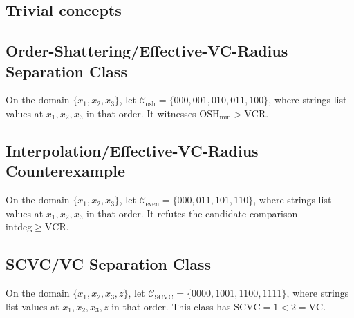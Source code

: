
  \subsection{Trivial concepts}\label{cl:trivial_concepts}
  \begin{definition}
  
  \end{definition}

  \subsection{Order-Shattering/Effective-VC-Radius Separation Class}\label{cl:order_shattering_effective_vc_radius_separation}
  \begin{definition}
  On the domain $\{x_1,x_2,x_3\}$, let
  $\mathcal C_{\mathrm{osh}}=\{000,001,010,011,100\}$, where strings list
  values at $x_1,x_2,x_3$ in that order.  It witnesses
  $\mathrm{OSH}_{\min}>\mathrm{VCR}$.
  \end{definition}

  \subsection{Interpolation/Effective-VC-Radius Counterexample}\label{cl:interpolation_effective_vc_radius_counterexample}
  \begin{definition}
  On the domain $\{x_1,x_2,x_3\}$, let
  $\mathcal C_{\mathrm{even}}=\{000,011,101,110\}$, where strings list
  values at $x_1,x_2,x_3$ in that order.  It refutes the candidate comparison
  $\mathrm{intdeg}\geq\mathrm{VCR}$.
  \end{definition}

  \subsection{SCVC/VC Separation Class}\label{cl:scvc_vc_separation}
  \begin{definition}
  On the domain $\{x_1,x_2,x_3,z\}$, let
  $\mathcal C_{\mathrm{SCVC}}=\{0000,1001,1100,1111\}$, where strings list
  values at $x_1,x_2,x_3,z$ in that order.  This class has
  $\mathrm{SCVC}=1<2=\mathrm{VC}$.
  \end{definition}

